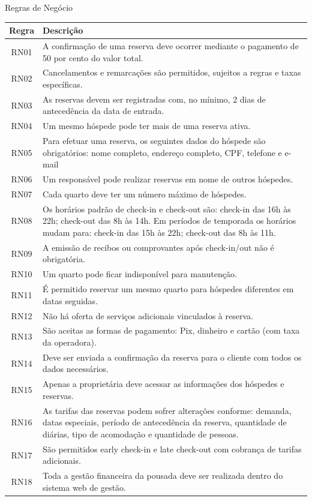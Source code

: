 \documentclass[
	12pt,				%
	openany,			%
	twoside,			%
	a4paper,			%
	english,			%
	french,				%
	spanish,			%
	brazil				%
	]{abntex2}
\begin{document}
\begin{quadro}[H]
	\caption{\label{quadro_rn}Regras de Negócio}
	\begin{tabular}{|c|p{8cm}|}
		\hline
		\textbf{Regra} & \textbf{Descrição}  \\ \hline	
		RN01 & A confirmação de uma reserva deve ocorrer mediante o pagamento de 50 por cento do valor total.   \\ \hline
		RN02 & Cancelamentos e remarcações são permitidos, sujeitos a regras e taxas específicas.   \\ \hline
		RN03 & As reservas devem ser registradas com, no mínimo, 2 dias de antecedência da data de entrada.  \\ \hline
		RN04 & Um mesmo hóspede pode ter mais de uma reserva ativa.   \\ \hline
		RN05 & Para efetuar uma reserva, os seguintes dados do hóspede são obrigatórios: nome completo, endereço completo, CPF, telefone e e-mail   \\ \hline
		RN06 & Um responsável pode realizar reservas em nome de outros hóspedes.   \\ \hline
		RN07 & Cada quarto deve ter um número máximo de hóspedes.   \\ \hline
		RN08 & Os horários padrão de check-in e check-out são: check-in das 16h às 22h; check-out das 8h às 14h. Em períodos de temporada os horários mudam para:  check-in das 15h às 22h; check-out das 8h às 11h.\\ \hline
		RN09 & A emissão de recibos ou comprovantes após check-in/out não é obrigatória.   \\ \hline
		RN10 & Um quarto pode ficar indisponível para manutenção.   \\ \hline
		RN11 & É permitido reservar um mesmo quarto para hóspedes diferentes em datas seguidas.   \\ \hline
		RN12 & Não há oferta de serviços adicionais vinculados à reserva.   \\ \hline
		RN13 & São aceitas as formas de pagamento: Pix, dinheiro e cartão (com taxa da operadora).   \\ \hline
		RN14 & Deve ser enviada a confirmação da reserva para o cliente com todos os dados necessários.   \\ \hline
		RN15 & Apenas a proprietária deve acessar as informações dos hóspedes e reservas.   \\ \hline
		RN16 & As tarifas das reservas podem sofrer alterações conforme: demanda, datas especiais, período de antecedência da reserva, quantidade de diárias, tipo de acomodação e quantidade de pessoas.   \\ \hline
		RN17 & São permitidos early check-in e late check-out com cobrança de tarifas adicionais.   \\ \hline
		RN18 & Toda a gestão financeira da pousada deve ser realizada dentro do sistema web de gestão.   \\ \hline
	\end{tabular}
\end{quadro}
\end{document}
